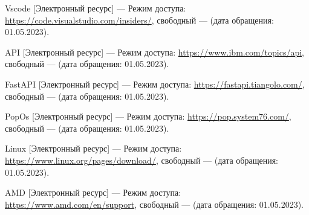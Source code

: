 \begin{thebibliography}{}
    Vscode [Электронный ресурс] --- Режим доступа:
    \url{https://code.visualstudio.com/insiders/}, свободный --- (дата обращения:
    01.05.2023).

    API [Электронный ресурс] --- Режим доступа:
    \url{https://www.ibm.com/topics/api}, свободный --- (дата обращения:
    01.05.2023).

    FastAPI [Электронный ресурс] --- Режим доступа:
    \url{https://fastapi.tiangolo.com/}, свободный --- (дата обращения:
    01.05.2023).

    PopOs [Электронный ресурс] --- Режим доступа: \url{https://pop.system76.com/}, свободный --- (дата обращения: 01.05.2023).

    Linux [Электронный ресурс] --- Режим доступа: \url{https://www.linux.org/pages/download/}, свободный --- (дата обращения: 01.05.2023).

    AMD [Электронный ресурс] --- Режим доступа: \url{https://www.amd.com/en/support}, свободный --- (дата обращения: 01.05.2023).
\end{thebibliography}
\endgroup

\pagebreak